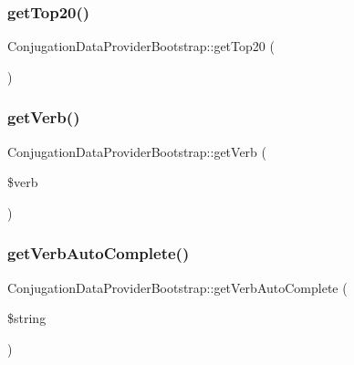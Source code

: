 \hypertarget{class_conjugation_data_provider_bootstrap_af959492587f9931545ac2290d722db5a}{}\label{class_conjugation_data_provider_bootstrap_af959492587f9931545ac2290d722db5a} 
\subsubsection{\texorpdfstring{get\+Top20()}{getTop20()}}
{\footnotesize\ttfamily Conjugation\+Data\+Provider\+Bootstrap\+::get\+Top20 (\begin{DoxyParamCaption}{ }\end{DoxyParamCaption})}

\hypertarget{class_conjugation_data_provider_bootstrap_a3e096bba403d060235d1ee9527c7fd6b}{}\label{class_conjugation_data_provider_bootstrap_a3e096bba403d060235d1ee9527c7fd6b} 
\subsubsection{\texorpdfstring{get\+Verb()}{getVerb()}}
{\footnotesize\ttfamily Conjugation\+Data\+Provider\+Bootstrap\+::get\+Verb (\begin{DoxyParamCaption}\item[{}]{\$verb }\end{DoxyParamCaption})}

\hypertarget{class_conjugation_data_provider_bootstrap_aa4a5a06e935255e64c39a0ff0584ecec}{}\label{class_conjugation_data_provider_bootstrap_aa4a5a06e935255e64c39a0ff0584ecec} 
\subsubsection{\texorpdfstring{get\+Verb\+Auto\+Complete()}{getVerbAutoComplete()}}
{\footnotesize\ttfamily Conjugation\+Data\+Provider\+Bootstrap\+::get\+Verb\+Auto\+Complete (\begin{DoxyParamCaption}\item[{}]{\$string }\end{DoxyParamCaption})}


